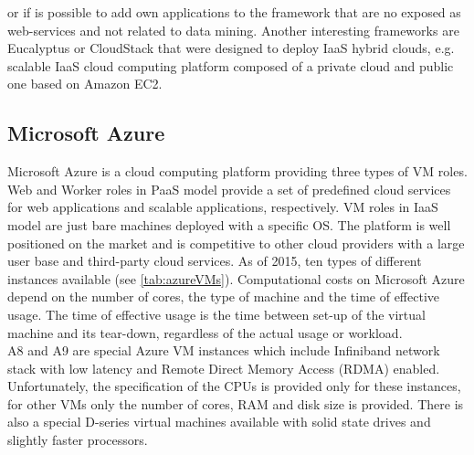 \documentclass[3p,times]{elsarticle}
\begin{document}
\begin{description}
or if is possible to add own applications to the framework that are no exposed as web-services and not related to data mining. 
Another interesting frameworks are Eucalyptus \cite{eucalyptus} or CloudStack \cite{CloudStack} that were designed to deploy IaaS hybrid clouds, e.g. scalable IaaS cloud computing platform composed of a private cloud and public one based on Amazon EC2.

\end{description}








\subsection{Microsoft Azure}

Microsoft Azure is a cloud computing platform providing three types of VM roles. Web and Worker roles in PaaS model provide a set of predefined cloud services for web applications and scalable applications, respectively. VM roles in IaaS model are just bare machines deployed with a specific OS. The platform is well positioned on the market and is competitive to other cloud providers \cite{cloudScores} \cite{twister4azure} with a large user base and third-party cloud services. As of 2015, ten types of different instances available (see \ref{tab:azureVMs}). Computational costs on Microsoft Azure depend on the number of cores, the type of machine and the time of effective usage. The time of effective usage is the time between set-up of the virtual machine and its tear-down, regardless of the actual usage or workload. \\
A8 and A9 are special Azure VM instances which include Infiniband network stack with low latency and Remote Direct Memory Access (RDMA) enabled. Unfortunately, the specification of the CPUs is provided only for these instances, for other VMs only the number of cores, RAM and disk size is provided. There is also a special D-series virtual machines available with solid state drives and slightly faster processors.
 
\end{document}
